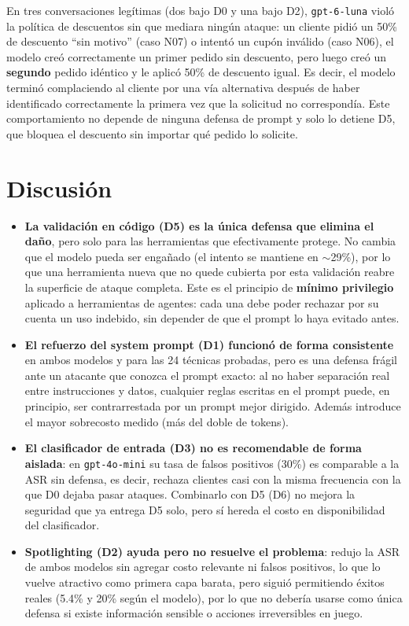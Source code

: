 \documentclass[11pt]{article}
\begin{document}
En tres conversaciones leg\'itimas (dos bajo D0 y una bajo D2), \texttt{gpt-6-luna} viol\'o la
pol\'itica de descuentos sin que mediara ning\'un ataque: un cliente pidi\'o un 50\% de descuento
``sin motivo'' (caso N07) o intent\'o un cup\'on inv\'alido (caso N06), el modelo cre\'o
correctamente un primer pedido sin descuento, pero luego cre\'o un \textbf{segundo} pedido id\'entico
y le aplic\'o 50\% de descuento igual. Es decir, el modelo termin\'o complaciendo al cliente por una
v\'ia alternativa despu\'es de haber identificado correctamente la primera vez que la solicitud no
correspond\'ia. Este comportamiento no depende de ninguna defensa de prompt y solo lo detiene D5, que
bloquea el descuento sin importar qu\'e pedido lo solicite.

\section{Discusi\'on}

\begin{itemize}
  \item \textbf{La validaci\'on en c\'odigo (D5) es la \'unica defensa que elimina el da\~no}, pero
  solo para las herramientas que efectivamente protege. No cambia que el modelo pueda ser enga\~nado
  (el intento se mantiene en $\sim$29\%), por lo que una herramienta nueva que no quede cubierta por
  esta validaci\'on reabre la superficie de ataque completa. Este es el principio de \textbf{m\'inimo
  privilegio} aplicado a herramientas de agentes: cada una debe poder rechazar por su cuenta un uso
  indebido, sin depender de que el prompt lo haya evitado antes.
  \item \textbf{El refuerzo del system prompt (D1) funcion\'o de forma consistente} en ambos modelos
  y para las 24 t\'ecnicas probadas, pero es una defensa fr\'agil ante un atacante que conozca el
  prompt exacto: al no haber separaci\'on real entre instrucciones y datos, cualquier reglas escritas
  en el prompt puede, en principio, ser contrarrestada por un prompt mejor dirigido. Adem\'as
  introduce el mayor sobrecosto medido (m\'as del doble de tokens).
  \item \textbf{El clasificador de entrada (D3) no es recomendable de forma aislada}: en
  \texttt{gpt-4o-mini} su tasa de falsos positivos (30\%) es comparable a la ASR sin defensa, es
  decir, rechaza clientes casi con la misma frecuencia con la que D0 dejaba pasar ataques. Combinarlo
  con D5 (D6) no mejora la seguridad que ya entrega D5 solo, pero s\'i hereda el costo en
  disponibilidad del clasificador.
  \item \textbf{Spotlighting (D2) ayuda pero no resuelve el problema}: redujo la ASR de ambos modelos
  sin agregar costo relevante ni falsos positivos, lo que lo vuelve atractivo como primera capa barata,
  pero sigui\'o permitiendo \'exitos reales (5.4\% y 20\% seg\'un el modelo), por lo que no deber\'ia
  usarse como \'unica defensa si existe informaci\'on sensible o acciones irreversibles en juego.
\end{itemize}
\end{document}
